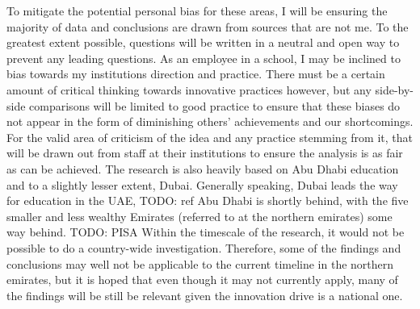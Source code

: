 To mitigate the potential personal bias for these areas, I will be ensuring the majority of data and conclusions are drawn from sources that are not me. To the greatest extent possible, questions will be written in a neutral and open way to prevent any leading questions.
As an employee in a school, I may be inclined to bias towards my institutions direction and practice. There must be a certain amount of critical thinking towards innovative practices however, but any side-by-side comparisons will be limited to good practice to ensure that these biases do not appear in the form of diminishing others’ achievements and our shortcomings. For the valid area of criticism of the idea and any practice stemming from it, that will be drawn out from staff at their institutions to ensure the analysis is as fair as can be achieved.
The research is also heavily based on Abu Dhabi education and to a slightly lesser extent, Dubai. Generally speaking, Dubai leads the way for education in the UAE, TODO: ref Abu Dhabi is shortly behind, with the five smaller and less wealthy Emirates (referred to at the northern emirates) some way behind. TODO: PISA Within the timescale of the research, it would not be possible to do a country-wide investigation. Therefore, some of the findings and conclusions may well not be applicable to the current timeline in the northern emirates, but it is hoped that even though it may not currently apply, many of the findings will be still be relevant given the innovation drive is a national one.